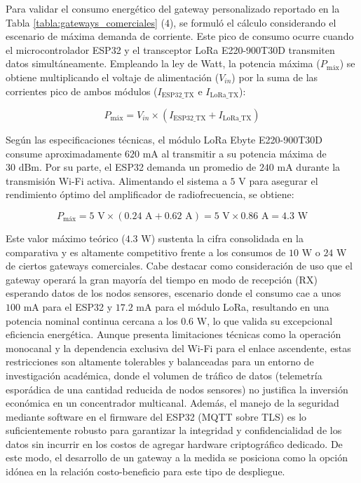 Para validar el consumo energético del gateway personalizado reportado en la Tabla \ref{tabla:gateways_comerciales} (4), se formuló el cálculo considerando el escenario de máxima demanda de corriente. Este pico de consumo ocurre cuando el microcontrolador ESP32 y el transceptor LoRa E220-900T30D transmiten datos simultáneamente. Empleando la ley de Watt, la potencia máxima ($P_{\text{máx}}$) se obtiene multiplicando el voltaje de alimentación ($V_{in}$) por la suma de las corrientes pico de ambos módulos ($I_{\text{ESP32\_TX}}$ e $I_{\text{LoRa\_TX}}$):

\begin{equation}
    P_{\text{máx}} = V_{in} \times (I_{\text{ESP32\_TX}} + I_{\text{LoRa\_TX}})
\end{equation}

Según las especificaciones técnicas, el módulo LoRa Ebyte E220-900T30D consume aproximadamente $620\text{ mA}$ al transmitir a su potencia máxima de $30\text{ dBm}$. Por su parte, el ESP32 demanda un promedio de $240\text{ mA}$ durante la transmisión Wi-Fi activa. Alimentando el sistema a $5\text{ V}$ para asegurar el rendimiento óptimo del amplificador de radiofrecuencia, se obtiene:

\begin{equation}
    P_{\text{máx}} = 5\text{ V} \times (0.24\text{ A} + 0.62\text{ A}) = 5\text{ V} \times 0.86\text{ A} = 4.3\text{ W}
\end{equation}

Este valor máximo teórico ($4.3\text{ W}$) sustenta la cifra consolidada en la comparativa y es altamente competitivo frente a los consumos de $10\text{ W}$ o $24\text{ W}$ de ciertos gateways comerciales. Cabe destacar como consideración de uso que el gateway operará la gran mayoría del tiempo en modo de recepción (RX) esperando datos de los nodos sensores, escenario donde el consumo cae a unos $100\text{ mA}$ para el ESP32 y $17.2\text{ mA}$ para el módulo LoRa, resultando en una potencia nominal continua cercana a los $0.6\text{ W}$, lo que valida su excepcional eficiencia energética. Aunque presenta limitaciones técnicas como la operación monocanal y la dependencia exclusiva del Wi-Fi para el enlace ascendente, estas restricciones son altamente tolerables y balanceadas para un entorno de investigación académica, donde el volumen de tráfico de datos (telemetría esporádica de una cantidad reducida de nodos sensores) no justifica la inversión económica en un concentrador multicanal. Además, el manejo de la seguridad mediante software en el firmware del ESP32 (MQTT sobre TLS) es lo suficientemente robusto para garantizar la integridad y confidencialidad de los datos sin incurrir en los costos de agregar hardware criptográfico dedicado. De este modo, el desarrollo de un gateway a la medida se posiciona como la opción idónea en la relación costo-beneficio para este tipo de despliegue.

